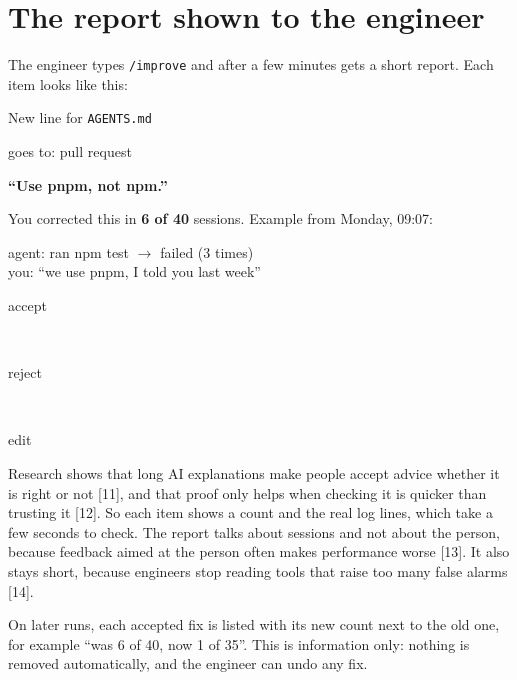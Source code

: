 \documentclass[10pt,twocolumn]{article}
\newcommand{\chip}[2]{\colorbox{#1}{\strut\scriptsize #2}}
\begin{document}
\section{The report shown to the engineer}
The engineer types \texttt{/improve} and after a few minutes gets a short report. Each item looks like this:

\begin{tcolorbox}[colback=white,colframe=gray!50,boxrule=0.5pt,arc=3pt,left=4pt,right=4pt,top=3pt,bottom=3pt,fontupper=\small]
\chip{saved}{New line for \texttt{AGENTS.md}} \chip{code}{goes to: pull request}\par\vspace{2pt}
\textbf{``Use pnpm, not npm.''}\par\vspace{2pt}
You corrected this in \textbf{6 of 40} sessions. Example from Monday, 09:07:\par
{\ttfamily\scriptsize
\hspace*{6pt}agent: ran npm test $\to$ failed (3 times)\\
\hspace*{6pt}you: ``we use pnpm, I told you last week''}\par\vspace{3pt}
\hfill\chip{saved}{accept}\ \chip{code}{reject}\ \chip{you}{edit}
\end{tcolorbox}

Research shows that long AI explanations make people accept advice whether it is right or not [11], and that proof only helps when checking it is quicker than trusting it [12]. So each item shows a count and the real log lines, which take a few seconds to check. The report talks about sessions and not about the person, because feedback aimed at the person often makes performance worse [13]. It also stays short, because engineers stop reading tools that raise too many false alarms [14].

On later runs, each accepted fix is listed with its new count next to the old one, for example ``was 6 of 40, now 1 of 35''. This is information only: nothing is removed automatically, and the engineer can undo any fix.
\end{document}
